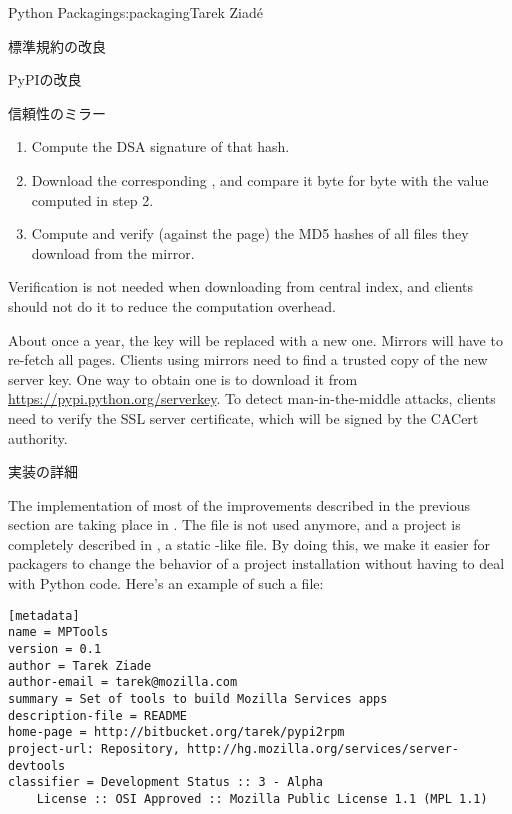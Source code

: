 \begin{aosachapter}{Python Packaging}{s:packaging}{Tarek Ziad\'{e}}
\begin{aosasect1}{標準規約の改良}
\begin{aosasect2}{PyPIの改良}
\begin{aosasect3}{信頼性のミラー}
\begin{enumerate}
  \item Compute the DSA signature of that hash.

  \item Download the corresponding , and compare it
  byte for byte with the value computed in step 2.

  \item Compute and verify (against the  page) the MD5
  hashes of all files they download from the mirror.

\end{enumerate}

Verification is not needed when downloading from central index, and
clients should not do it to reduce the computation overhead.

About once a year, the key will be replaced with a new one. Mirrors
will have to re-fetch all  pages. Clients using
mirrors need to find a trusted copy of the new server key. One way to
obtain one is to download it from
\url{https://pypi.python.org/serverkey}.  To detect man-in-the-middle
attacks, clients need to verify the SSL server certificate, which will
be signed by the CACert authority.

\end{aosasect3}

\end{aosasect2}

\end{aosasect1}

\begin{aosasect1}{実装の詳細}

The implementation of most of the improvements described in the previous
section are taking place in .  The 
file is not used anymore, and a project is completely described in
, a static -like file.  By doing this, we
make it easier for packagers to change the behavior of a project
installation without having to deal with Python code.  Here's an
example of such a file:

\begin{verbatim}
[metadata]
name = MPTools
version = 0.1
author = Tarek Ziade
author-email = tarek@mozilla.com
summary = Set of tools to build Mozilla Services apps
description-file = README
home-page = http://bitbucket.org/tarek/pypi2rpm
project-url: Repository, http://hg.mozilla.org/services/server-devtools
classifier = Development Status :: 3 - Alpha
    License :: OSI Approved :: Mozilla Public License 1.1 (MPL 1.1)
\end{verbatim}


\end{aosasect1}
\end{aosachapter}
